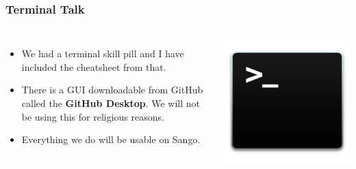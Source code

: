 \documentclass{beamer}
\begin{document}
\begin{frame}[fragile]
\frametitle{Terminal Talk}
\begin{columns}

\begin{itemize}
\item We had a terminal skill pill and I have included the cheatsheet from that. 
\item There is a GUI downloadable from GitHub called the \textbf{GitHub Desktop}. We will not be using this for religious reasons.
\item Everything we do will be usable on Sango.
\end{itemize}

\includegraphics[width=\textwidth]{terminal.png}
\end{columns}
\end{frame}
\end{document}
